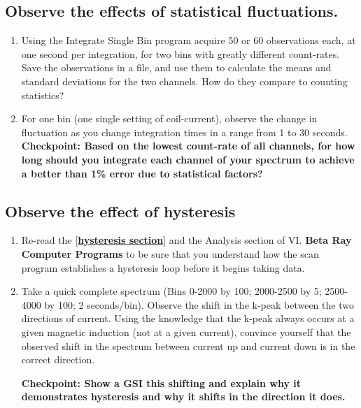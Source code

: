 \documentclass{../lab}
\begin{document}
\subsection{Observe the effects of statistical fluctuations.}

\begin{enumerate}
    \item Using the Integrate Single Bin program acquire 50 or 60 observations each, at one second per integration, for two bins with greatly different count-rates. Save the observations in a file, and use them to calculate the means and standard deviations for the two channels. How do they compare to counting statistics?

    \item For one bin (one single setting of coil-current), observe the change in fluctuation as you change integration times in a range from 1 to 30 seconds. 
    \textbf{Checkpoint: Based on the lowest count-rate of all channels, for how long should you integrate each channel of your spectrum to achieve a better than 1\% error due to statistical factors?}
\end{enumerate}

\subsection{Observe the effect of hysteresis}

\begin{enumerate}
    \item Re-read the [\href{http://experimentationlab.berkeley.edu/Hysteresis}{\textbf{hysteresis section}}] and the Analysis section of VI. \textbf{Beta Ray Computer Programs} to be sure that you understand how the scan program establishes a hysteresis loop before it begins taking data.

    \item Take a quick complete spectrum (Bins 0-2000 by 100; 2000-2500 by 5; 2500-4000 by 100; 2 seconds/bin). Observe the shift in the k-peak between the two directions of current. Using the knowledge that the k-peak always occurs at a given magnetic induction (not at a given current), convince yourself that the observed shift in the spectrum between current up and current down is in the correct direction.
    
    \textbf{Checkpoint: Show a GSI this shifting and explain why it demonstrates hysteresis and why it shifts in the direction it does.}

\end{enumerate}
\end{document}
